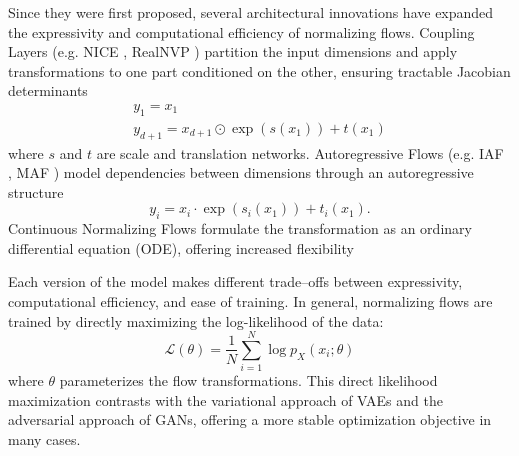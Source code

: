         Since they were first proposed, several architectural innovations have expanded the expressivity and computational efficiency of normalizing flows.
        Coupling Layers (e.g. NICE , RealNVP ) partition the input dimensions and apply transformations to one part conditioned on the other, ensuring tractable Jacobian determinants
        \begin{gather}
            y_{1} = x_{1} \\
            y_{d+1} = x_{d+1} \odot \exp(s(x_{1})) + t(x_{1})
        \end{gather}
        where \(s\) and \(t\) are scale and translation networks.
        Autoregressive Flows (e.g. IAF , MAF ) model dependencies between dimensions through an autoregressive structure
        \begin{equation}
            y_i = x_i \cdot \exp(s_i(x_{1})) + t_i(x_{1}).
        \end{equation}
        Continuous Normalizing Flows  formulate the transformation as an ordinary differential equation (ODE), offering increased flexibility

        Each version of the model makes different trade--offs between expressivity, computational efficiency, and ease of training.
        In general, normalizing flows are trained by directly maximizing the log-likelihood of the data:
        \begin{equation}
            \mathcal{L}(\theta) = \frac{1}{N} \sum_{i=1}^{N} \log p_X(x_i; \theta)
        \end{equation}
        where \(\theta\) parameterizes the flow transformations.
        This direct likelihood maximization contrasts with the variational approach of VAEs and the adversarial approach of GANs, offering a more stable optimization objective in many cases.

